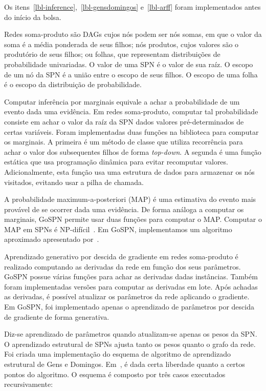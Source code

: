\documentclass[12pt]{article}
\theoremstyle{plain}
\numberwithin{equation}{section}
\begin{document}
Os itens~\ref{lbl-inference},~\ref{lbl-gensdomingos} e~\ref{lbl-arff} foram implementados antes do
início da bolsa.

Redes soma-produto são DAGs cujos nós podem ser nós somas, em que o valor da soma é a média
ponderada de seus filhos; nós produtos, cujos valores são o produtório de seus filhos; ou folhas,
que representam distribuições de probabilidade univariadas. O valor de uma SPN é o valor de sua
raíz. O escopo de um nó da SPN é a união entre o escopo de seus filhos. O escopo de uma folha é o
escopo da distribuição de probabilidade.

Computar inferência por marginais equivale a achar a probabilidade de um evento dada uma evidência.
Em redes soma-produto, computar tal probabilidade consiste em achar o valor da raíz da SPN dados
valores pré-determinados de certas variáveis. Foram implementadas duas funções na biblioteca para
computar os marginais. A primeira é um método de classe que utiliza recorrência para achar o valor
dos subsequentes filhos de forma \textit{top-down}. A segunda é uma função estática que usa
programação dinâmica para evitar recomputar valores. Adicionalmente, esta função usa uma estrutura
de dados para armazenar os nós visitados, evitando usar a pilha de chamada.

A probabilidade maximum-a-posteriori (MAP) é uma estimativa do evento mais provável de se ocorrer
dada uma evidência. De forma análoga a computar os marginais, GoSPN permite usar duas funções para
computar o MAP\@. Computar o MAP em SPNs é NP-difícil~\cite{peharz-spn,cmc2017}. Em GoSPN,
implementamos um algoritmo aproximado apresentado por~\cite{poon-domingos}.

Aprendizado generativo por descida de gradiente em redes soma-produto é realizado computando as
derivadas da rede em função dos seus parâmetros. GoSPN possue várias funções para achar as
derivadas dadas instâncias. Também foram implementadas versões para computar as derivadas em lote.
Após achadas as derivadas, é possível atualizar os parâmetros da rede aplicando o gradiente. Em
GoSPN, foi implementado apenas o aprendizado de parâmetros por descida de gradiente de forma
generativa.

Diz-se aprendizado de parâmetros quando atualizam-se apenas os pesos da SPN\@. O aprendizado
estrutural de SPNs ajusta tanto os pesos quanto o grafo da rede. Foi criada uma implementação do
esquema de algoritmo de aprendizado estrutural de Gens e Domingos. Em~\cite{gens-domingos}, é dada
certa liberdade quanto a certos pontos do algoritmo. O esquema é composto por três casos executados
recursivamente:
\end{document}
